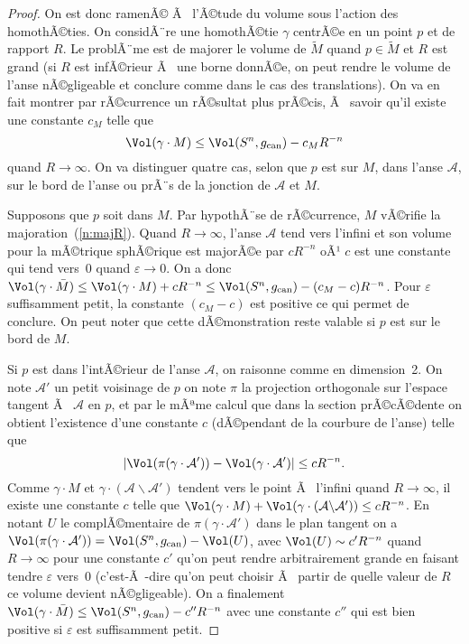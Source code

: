 \documentclass[11pt,a4paper]{smfart}
\begin{document}
\begin{proof}
On est donc ramenÃ© Ã  l'Ã©tude du volume sous l'action des homothÃ©ties.
On considÃ¨re une homothÃ©tie $\gamma$ centrÃ©e en un point $p$ et de rapport $R$.
Le problÃ¨me est de majorer le volume de $\tilde M$ quand $p\in\tilde M$
et $R$ est grand (si $R$ est infÃ©rieur Ã  une borne donnÃ©e, on peut rendre
le volume de l'anse nÃ©gligeable et conclure comme dans le cas des
translations).
On va en fait montrer par rÃ©currence un rÃ©sultat plus prÃ©cis, Ã  savoir
qu'il existe une constante $c_M$ telle que
\begin{equation}\label{n:majR}
\Vol(\gamma\cdot M)\leq\Vol(S^n,g_{\textrm{can}})-c_MR^{-n}
\end{equation}
quand $R\to\infty$.
On va distinguer quatre cas, selon que $p$ est sur $M$,
dans l'anse $\mathcal A$, sur le bord de l'anse ou prÃ¨s de la jonction
de $\mathcal A$ et $M$.

Supposons que $p$ soit dans $M$. Par hypothÃ¨se de rÃ©currence,
$M$ vÃ©rifie la majoration~(\ref{n:majR}). Quand $R\to\infty$, l'anse
$\mathcal A$ tend vers l'infini et son volume pour la mÃ©trique
sphÃ©rique est majorÃ©e par $cR^{-n}$ oÃ¹ $c$ est une constante qui tend
vers~0 quand $\varepsilon\to0$. On a donc $\Vol(\gamma\cdot \bar M)\leq
\Vol(\gamma\cdot M)+cR^{-n}\leq\Vol(S^n,g_{\textrm{can}})-(c_M-c)R^{-n}$.
Pour $\varepsilon$ suffisamment petit, la constante $(c_M-c)$ est
positive ce qui permet de conclure. On peut noter que cette dÃ©monstration
reste valable si $p$ est sur le bord de $M$.

Si $p$ est dans l'intÃ©rieur de l'anse $\mathcal A$, on raisonne comme en
dimension~2.
On note $\mathcal A'$ un petit voisinage de $p$
on note $\pi$ la projection orthogonale sur l'espace tangent Ã 
$\mathcal A$ en $p$, et par le mÃªme calcul que dans la section prÃ©cÃ©dente
on obtient l'existence
d'une constante $c$ (dÃ©pendant de la courbure de l'anse) telle que
\begin{equation}
|\Vol(\pi(\gamma\cdot \mathcal A'))-\Vol(\gamma\cdot \mathcal A')|\leq cR^{-n}.
\end{equation}
Comme $\gamma\cdot M$ et $\gamma\cdot (\mathcal A\backslash\mathcal A')$
tendent vers le point Ã  l'infini quand $R\to\infty$,
il existe une constante $c$ telle que $\Vol(\gamma\cdot M)+\Vol(\gamma\cdot
(\mathcal A\backslash\mathcal A'))\leq cR^{-n}$.
En notant $U$ le complÃ©mentaire de $\pi(\gamma\cdot \mathcal A')$ dans
le plan tangent on a $\Vol(\pi(\gamma\cdot \mathcal A'))=
\Vol(S^n,g_{\textrm{can}})-\Vol(U)$, avec $\Vol(U)\sim c'R^{-n}$ quand
$R\to\infty$ pour une constante $c'$ qu'on peut rendre arbitrairement grande
en faisant tendre $\varepsilon$ vers~0 (c'est-Ã -dire qu'on peut choisir
Ã  partir de quelle valeur de $R$ ce volume devient nÃ©gligeable). On a
finalement $\Vol(\gamma\cdot\bar M)\leq
\Vol(S^n,g_{\textrm{can}})-c''R^{-n}$ avec une constante $c''$ qui est bien
positive si $\varepsilon$ est suffisamment petit.


\end{proof}
\end{document}
